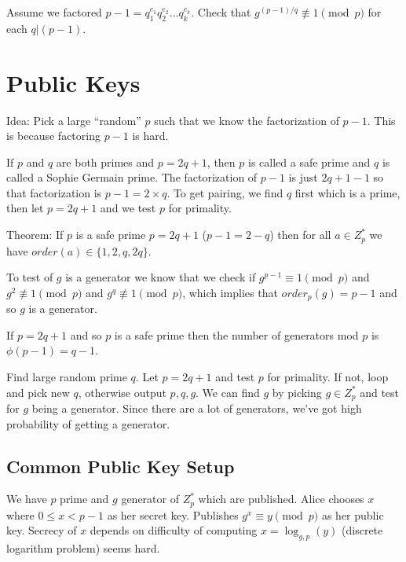 \documentclass[psamsfonts]{amsart}
\begin{document}
Assume we factored $p-1 = q_1^{e_1} q_2^{e_2} \ldots q_k^{e_k}$. Check that $g^{(p-1)/q} \not \equiv 1 \pmod{p}$ for each $q | (p-1)$.

\section{Public Keys}

Idea: Pick a large ``random'' $p$ such that we know the factorization of $p-1$. This is because factoring $p-1$ is hard.

If $p$ and $q$ are both primes and $p = 2q+1$, then $p$ is called a safe prime and $q$ is called a Sophie Germain prime. The factorization of $p-1$ is just $2q+1-1$ so that factorization is $p-1 = 2 \times q$. To get pairing, we find $q$ first which is a prime, then let $p = 2q + 1$ and we test $p$ for primality.

Theorem: If $p$ is a safe prime $p = 2q+1$ ($p-1 = 2-q$) then for all $a \in Z_p^*$ we have $order(a) \in \{1, 2, q, 2q\}$.

To test of $g$ is a generator we know that we check if $g^{p-1} \equiv 1 \pmod{p}$ and $g^2 \not \equiv 1 \pmod{p}$ and $g^q \not \equiv 1 \pmod{p}$, which implies that $order_p(g) = p-1$ and so $g$ is a generator.

If $p = 2q + 1$ and so $p$ is a safe prime then the number of generators mod $p$ is $\phi(p-1) = q-1$.

Find large random prime $q$. Let $p = 2q + 1$ and test $p$ for primality. If not, loop and pick new $q$, otherwise output $p,q,g$. We can find $g$ by picking $g \in Z_{p}^*$ and test for $g$ being a generator. Since there are a lot of generators, we've got high probability of getting a generator.

\subsection{Common Public Key Setup}

We have $p$ prime and $g$ generator of $Z_{p}^*$ which are published. Alice chooses $x$ where $0 \leq x < p-1$ as her secret key. Publishes $g^{x} \equiv y \pmod{p}$ as her public key. Secrecy of $x$ depends on difficulty of computing $x = \log_{g,p} (y)$ (discrete logarithm problem) seems hard.
\end{document}
